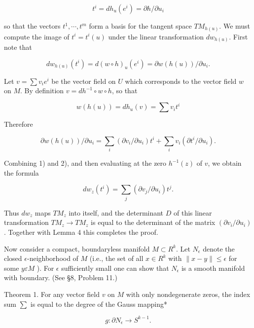 \documentclass[10pt, letterpaper]{article}
\begin{document}
$$
t^{i}=d h_{u}\left(e^{i}\right)=\partial h / \partial u_{i}
$$

so that the vectors $t^{1}, \cdots, t^{m}$ form a basis for the tangent space $T M_{h(u)}$. We must compute the image of $t^{i}=t^{i}(u)$ under the linear transformation $d w_{h(u)}$. First note that

$$
d w_{h(u)}\left(t^{i}\right)=d(w \circ h)_{u}\left(e^{i}\right)=\partial w(h(u)) / \partial u_{i} .
$$

Let $v=\sum v_{i} e^{i}$ be the vector field on $U$ which corresponds to the vector field $w$ on $M$. By definition $v=d h^{-1} \circ w \circ h$, so that

$$
w(h(u))=d h_{u}(v)=\sum v_{i} t^{i}
$$

Therefore

$$
\partial w(h(u)) / \partial u_{i}=\sum_{i}\left(\partial v_{i} / \partial u_{i}\right) t^{i}+\sum_{i} v_{i}\left(\partial t^{i} / \partial u_{i}\right) .
$$

Combining 1) and 2), and then evaluating at the zero $h^{-1}(z)$ of $v$, we obtain the formula

$$
d w_{z}\left(t^{i}\right)=\sum_{j}\left(\partial v_{j} / \partial u_{i}\right) t^{j} .
$$

Thus $d w_{z}$ maps $T M_{z}$ into itself, and the determinant $D$ of this linear transformation $T M_{z} \rightarrow T M_{z}$ is equal to the determinant of the matrix $\left(\partial v_{i} / \partial u_{i}\right)$. Together with Lemma 4 this completes the proof.

Now consider a compact, boundaryless manifold $M \subset R^{k}$. Let $N_{\epsilon}$ denote the closed $\epsilon$-neighborhood of $M$ (i.e., the set of all $x \in R^{k}$ with $\|x-y\| \leq \epsilon$ for some $y \varepsilon M$ ). For $\epsilon$ sufficiently small one can show that $N_{\epsilon}$ is a smooth manifold with boundary. (See §8, Problem 11.)

Theorem 1. For any vector field $v$ on $M$ with only nondegenerate zeros, the index sum $\sum$ is equal to the degree of the Gauss mapping*

$$
g: \partial N_{\epsilon} \rightarrow S^{k-1} .
$$
\end{document}
